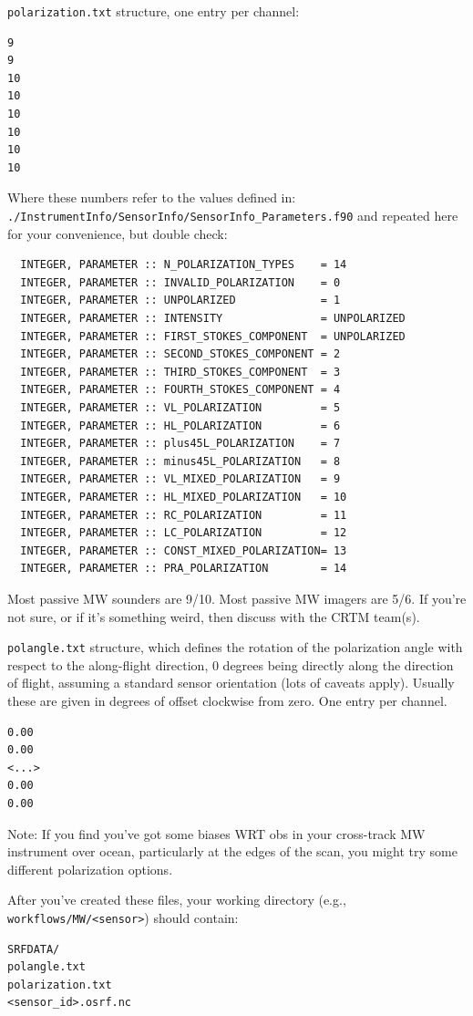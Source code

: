 \verb|polarization.txt| structure, one entry per channel:
\begin{verbatim}
9
9
10
10
10
10
10
10
\end{verbatim}
Where these numbers refer to the values defined in:
\verb|./InstrumentInfo/SensorInfo/SensorInfo_Parameters.f90|
and repeated here for your convenience, but double check:
\begin{verbatim}
  INTEGER, PARAMETER :: N_POLARIZATION_TYPES    = 14
  INTEGER, PARAMETER :: INVALID_POLARIZATION    = 0
  INTEGER, PARAMETER :: UNPOLARIZED             = 1
  INTEGER, PARAMETER :: INTENSITY               = UNPOLARIZED
  INTEGER, PARAMETER :: FIRST_STOKES_COMPONENT  = UNPOLARIZED
  INTEGER, PARAMETER :: SECOND_STOKES_COMPONENT = 2
  INTEGER, PARAMETER :: THIRD_STOKES_COMPONENT  = 3
  INTEGER, PARAMETER :: FOURTH_STOKES_COMPONENT = 4
  INTEGER, PARAMETER :: VL_POLARIZATION         = 5
  INTEGER, PARAMETER :: HL_POLARIZATION         = 6
  INTEGER, PARAMETER :: plus45L_POLARIZATION    = 7
  INTEGER, PARAMETER :: minus45L_POLARIZATION   = 8
  INTEGER, PARAMETER :: VL_MIXED_POLARIZATION   = 9
  INTEGER, PARAMETER :: HL_MIXED_POLARIZATION   = 10
  INTEGER, PARAMETER :: RC_POLARIZATION         = 11
  INTEGER, PARAMETER :: LC_POLARIZATION         = 12
  INTEGER, PARAMETER :: CONST_MIXED_POLARIZATION= 13
  INTEGER, PARAMETER :: PRA_POLARIZATION        = 14
\end{verbatim}
Most passive MW sounders are 9/10.   Most passive MW imagers are 5/6.   If you're not sure, or if it's something weird, then discuss with the CRTM team(s).   

\verb|polangle.txt| structure, which defines the rotation of the polarization angle with respect to the along-flight direction, 0 degrees being directly along the direction of flight, assuming a standard sensor orientation (lots of caveats apply).  Usually these are given in degrees of offset clockwise from zero.   One entry per channel. 
\begin{verbatim}
0.00
0.00
<...> 
0.00
0.00
\end{verbatim}
Note: If you find you've got some biases WRT obs in your cross-track MW instrument over ocean, particularly at the edges of the scan, you might try some different polarization options. 

After you've created these files, your working directory (e.g., \verb|workflows/MW/<sensor>|) should contain:
\begin{verbatim}
SRFDATA/
polangle.txt
polarization.txt
<sensor_id>.osrf.nc
\end{verbatim}

